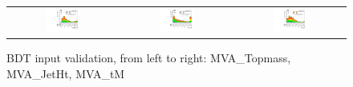 \begin{figure}[tbh!]
 \begin{center}
 \begin{tabular}{ccc}
  \includegraphics[width=0.325\textwidth]{figures/Part3/BDT/Topmass}&
    \includegraphics[width=0.325\textwidth]{figures/Part3/BDT/JetHt}&
  \includegraphics[width=0.325\textwidth]{figures/Part3/BDT/tM}\\
 \end{tabular}
 \caption{BDT input validation, from left to right: MVA\_Topmass, MVA\_JetHt, MVA\_tM}
 \label{fig:input_vali_3}
 \end{center}
\end{figure}

